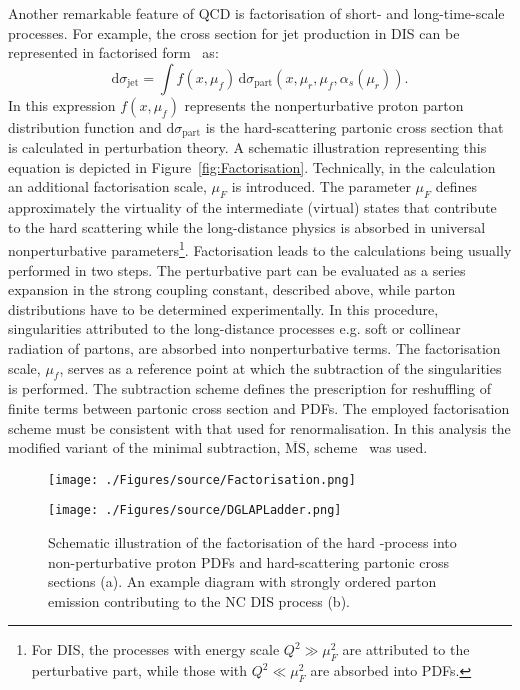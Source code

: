 Another remarkable feature of QCD is factorisation of short- and long-time-scale processes. For example, the cross section for jet production in DIS can be represented in factorised form~\cite{Collins:1989gx} as:
\begin{equation}
 \mathrm{d}\sigma_{\mathrm{jet}} = \int{f\left(x,\mu_f\right)}\, \mathrm{d}\sigma_{\mathrm{part}}\left(x,\mu_r, \mu_f, \alpha_s\left(\mu_r\right) \right).
\label{eq:disfactorisation}
\end{equation} 
In this expression $f\left(x,\mu_f\right)$ represents the nonperturbative proton parton distribution function and $\mathrm{d}\sigma_{\mathrm{part}}$ is the hard-scattering partonic cross section that is calculated in perturbation theory. A schematic illustration representing this equation is depicted in Figure~\ref{fig:Factorisation}. Technically, in the calculation an additional factorisation scale, $\mu_F$ is introduced. The parameter $\mu_F$ defines approximately the virtuality of the intermediate (virtual) states that contribute to the hard scattering while the long-distance physics is absorbed in universal nonperturbative parameters\footnote{For DIS, the processes with energy scale $Q^2 \gg \mu_F^2 $ are attributed to the perturbative part, while those with $Q^2 \ll \mu_F^2 $ are absorbed into PDFs.}. Factorisation leads to the calculations being usually performed in two steps. The perturbative part can be evaluated as a series expansion in the strong coupling constant, described above, while parton distributions have to be determined experimentally. In this procedure, singularities attributed to the long-distance processes e.g. soft or collinear radiation of partons, are absorbed into nonperturbative terms. The factorisation scale, $\mu_f$, serves as a reference point at which the subtraction of the singularities is performed. The subtraction scheme defines the prescription for reshuffling of finite terms between partonic cross section and PDFs. The employed factorisation scheme must be consistent with that used for renormalisation. In this analysis the modified variant of the minimal subtraction, $\overline{\mathrm{MS}}$, scheme~\cite{Bardeen:1978yd} was used.
\begin{figure}[t]
	\centering
	\begin{subfloat}[]{
		\texttt{[image: ./Figures/source/Factorisation.png]}
		\label{fig:Factorisation}
	 }%
	\end{subfloat}
	\begin{subfloat}[]{
		\texttt{[image: ./Figures/source/DGLAPLadder.png]}
		\label{fig:DGLAPLadder}
	}%
	\end{subfloat}
	\caption{Schematic illustration of the factorisation of the hard \ep-process into non-perturbative proton PDFs and hard-scattering partonic cross sections (a). An example diagram with strongly ordered parton emission contributing to the NC DIS process (b).}
	\label{fig:factorisationdglapladder}
\end{figure}
